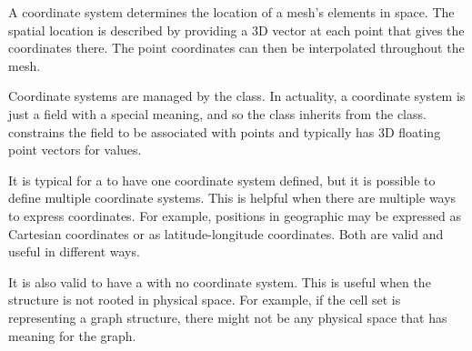 A coordinate system determines the location of a mesh's elements in space.
The spatial location is described by providing a 3D vector at each point
that gives the coordinates there. The point coordinates can then be
interpolated throughout the mesh.

Coordinate systems are managed by the  class. In
actuality, a coordinate system is just a field with a special meaning, and
so the  class inherits from the
 class.  constrains
the field to be associated with points and typically has 3D floating point
vectors for values.

It is typical for a  to have one coordinate system
defined, but it is possible to define multiple coordinate systems. This is
helpful when there are multiple ways to express coordinates. For example,
positions in geographic may be expressed as Cartesian coordinates or as
latitude-longitude coordinates. Both are valid and useful in different
ways.

It is also valid to have a  with no coordinate
system. This is useful when the structure is not rooted in physical space.
For example, if the cell set is representing a graph structure, there might
not be any physical space that has meaning for the graph.







